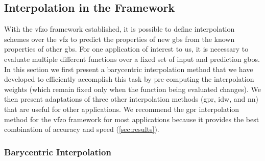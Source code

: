 \documentclass[final,twocolumn,12pt]{elsarticle}
\newcommand{\inpt}{input}
\newcommand{\outpt}{prediction}
\begin{document}
{\subsection{Interpolation in the  Framework}
\label{sec:methods:interp}

With the \gls{vfzo} framework established, it is possible to define interpolation schemes over the \gls{vfz} to predict the properties of new \glspl{gb} from the known properties of other \glspl{gb}. For one application of interest to us, it is necessary to evaluate multiple different functions over a fixed set of \inpt{} and \outpt{} \glspl{gbo}. In this section we first present a barycentric interpolation method that we have developed to efficiently accomplish this task by pre-computing the interpolation weights (which remain fixed only when the function being evaluated changes). We then present adaptations of three other interpolation methods (\gls{gpr}, \gls{idw}, and \gls{nn}) that are useful for other applications. We recommend the \gls{gpr} interpolation method for the \gls{vfzo} framework for most applications because it provides the best combination of accuracy and speed (\cref{sec:results}).

\subsubsection{Barycentric Interpolation}
\label{sec:methods:interp:bary}



}
\end{document}
